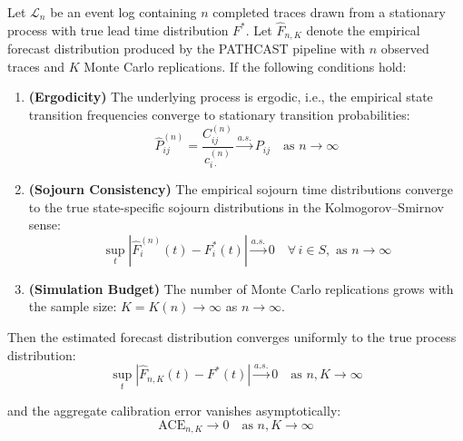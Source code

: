 \begin{theorem}
\label{thm:pipeline-convergence}
Let $\mathcal{L}_n$ be an event log containing $n$ completed traces drawn
from a stationary process with true lead time distribution $F^*$. Let
$\hat{F}_{n,K}$ denote the empirical forecast distribution produced by the
PATHCAST pipeline with $n$ observed traces and $K$ Monte Carlo
replications. If the following conditions hold:

\begin{enumerate}
    \item \textbf{(Ergodicity)} The underlying process is ergodic, i.e.,
    the empirical state transition frequencies converge to stationary
    transition probabilities:
    \begin{equation}
    \hat{P}_{ij}^{(n)} = \frac{C_{ij}^{(n)}}{c_{i\cdot}^{(n)}}
    \xrightarrow{a.s.} P_{ij} \quad \text{as } n \to \infty
    \end{equation}

    \item \textbf{(Sojourn Consistency)} The empirical sojourn time
    distributions converge to the true state-specific sojourn
    distributions in the Kolmogorov--Smirnov sense:
    \begin{equation}
    \sup_{t} \left| \hat{F}_i^{(n)}(t) - F_i^*(t) \right|
    \xrightarrow{a.s.} 0 \quad \forall\, i \in S, \text{ as } n \to \infty
    \end{equation}

    \item \textbf{(Simulation Budget)} The number of Monte Carlo
    replications grows with the sample size: $K = K(n) \to \infty$ as
    $n \to \infty$.
\end{enumerate}

\noindent Then the estimated forecast distribution converges uniformly to
the true process distribution:
\begin{equation}
\label{eq:pipeline-convergence}
\sup_{t} \left| \hat{F}_{n,K}(t) - F^*(t) \right|
\xrightarrow{a.s.} 0 \quad \text{as } n, K \to \infty
\end{equation}

\noindent and the aggregate calibration error vanishes asymptotically:
\begin{equation}
\label{eq:ace-convergence}
\text{ACE}_{n,K} \to 0 \quad \text{as } n, K \to \infty
\end{equation}
\end{theorem}

